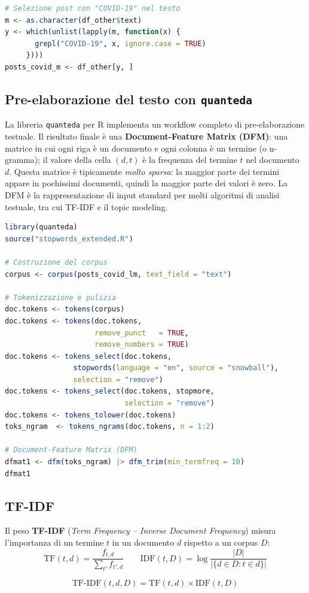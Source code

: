 \documentclass[12pt,a4paper]{article}
\newcommand{\formula}[1]{%
  \begin{equation*}#1\end{equation*}%
}
\begin{document}
\begin{lstlisting}[language=R]
# Selezione post con "COVID-19" nel testo
m <- as.character(df_other$text)
y <- which(unlist(lapply(m, function(x) {
       grepl("COVID-19", x, ignore.case = TRUE)
     })))
posts_covid_m <- df_other[y, ]
\end{lstlisting}

\subsection{Pre-elaborazione del testo con \texttt{quanteda}}

La libreria \texttt{quanteda} per R implementa un workflow completo di pre-elaborazione
testuale. Il risultato finale è una \textbf{Document-Feature Matrix (DFM)}: una matrice
in cui ogni riga è un documento e ogni colonna è un termine (o n-gramma); il valore della
cella $(d,t)$ è la frequenza del termine $t$ nel documento $d$. Questa matrice è tipicamente
\emph{molto sparsa}: la maggior parte dei termini appare in pochissimi documenti, quindi
la maggior parte dei valori è zero. La DFM è la rappresentazione di input standard per
molti algoritmi di analisi testuale, tra cui TF-IDF e il topic modeling.

\begin{lstlisting}[language=R]
library(quanteda)
source("stopwords_extended.R")

# Costruzione del corpus
corpus <- corpus(posts_covid_lm, text_field = "text")

# Tokenizzazione e pulizia
doc.tokens <- tokens(corpus)
doc.tokens <- tokens(doc.tokens,
                     remove_punct   = TRUE,
                     remove_numbers = TRUE)
doc.tokens <- tokens_select(doc.tokens,
                stopwords(language = "en", source = "snowball"),
                selection = "remove")
doc.tokens <- tokens_select(doc.tokens, stopmore,
                            selection = "remove")
doc.tokens <- tokens_tolower(doc.tokens)
toks_ngram  <- tokens_ngrams(doc.tokens, n = 1:2)

# Document-Feature Matrix (DFM)
dfmat1 <- dfm(toks_ngram) |> dfm_trim(min_termfreq = 10)
dfmat1
\end{lstlisting}

\subsection{TF-IDF}

Il peso \textbf{TF-IDF} (\textit{Term Frequency – Inverse Document Frequency})
misura l'importanza di un termine $t$ in un documento $d$ rispetto a un corpus $D$:
\formula{
  \text{TF}(t,d) = \frac{f_{t,d}}{\sum_{t'} f_{t',d}}
  \qquad
  \text{IDF}(t,D) = \log\frac{|D|}{|\{d \in D : t \in d\}|}
}
\formula{
  \text{TF-IDF}(t,d,D) = \text{TF}(t,d) \times \text{IDF}(t,D)
}
\end{document}

